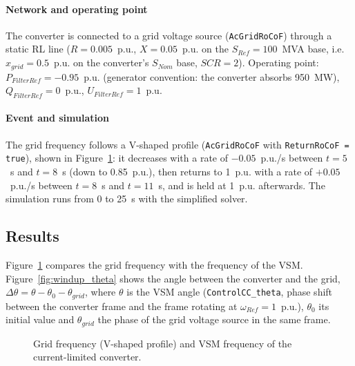 \documentclass[a4paper, 12pt]{report}
\begin{document}
\paragraph{Network and operating point}
The converter is connected to a grid voltage source (\texttt{AcGridRoCoF}) through a static RL line ($R = 0.005$~p.u., $X = 0.05$~p.u. on the $S_{Ref} = 100$~MVA base, i.e. $x_{grid} = 0.5$~p.u. on the converter's $S_{Nom}$ base, $SCR = 2$). Operating point: $P_{FilterRef} = -0.95$~p.u. (generator convention: the converter absorbs 950~MW), $Q_{FilterRef} = 0$~p.u., $U_{FilterRef} = 1$~p.u.

\paragraph{Event and simulation}
The grid frequency follows a V-shaped profile (\texttt{AcGridRoCoF} with \texttt{ReturnRoCoF = true}), shown in Figure~\ref{fig:windup_omega}: it decreases with a rate of $-0.05$~p.u./s between $t = 5$~s and $t = 8$~s (down to 0.85~p.u.), then returns to 1~p.u. with a rate of $+0.05$~p.u./s between $t = 8$~s and $t = 11$~s, and is held at 1~p.u. afterwards. The simulation runs from 0 to 25~s with the simplified solver.

\subsection*{Results}
Figure~\ref{fig:windup_omega} compares the grid frequency with the frequency of the VSM. Figure~\ref{fig:windup_theta} shows the angle between the converter and the grid, $\Delta\theta = \theta - \theta_0 - \theta_{grid}$, where $\theta$ is the VSM angle (\texttt{ControlCC\_theta}, phase shift between the converter frame and the frame rotating at $\omega_{Ref} = 1$~p.u.), $\theta_0$ its initial value and $\theta_{grid}$ the phase of the grid voltage source in the same frame.

\begin{figure}[H]
\centering
{}
\caption{Grid frequency (V-shaped profile) and VSM frequency of the current-limited converter.}
\label{fig:windup_omega}
\end{figure}
\end{document}
